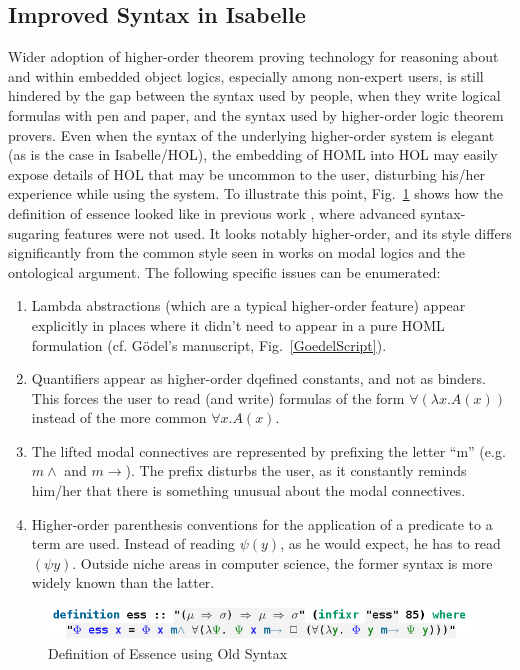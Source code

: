 \documentclass{article}
\newcommand{\imp}{{\rightarrow}}
\begin{document}
\subsection{Improved Syntax in Isabelle}\label{sec:improvedsyntax}

Wider adoption of higher-order theorem proving technology for reasoning about and within embedded object logics, especially among non-expert users, is still hindered by the gap between the syntax used by people, when they write logical formulas with pen and paper, and the syntax used by higher-order logic theorem provers. Even when the syntax of the underlying higher-order system is elegant (as is the case in Isabelle/HOL), the embedding of HOML into HOL may easily expose details of HOL that may be uncommon to the user, disturbing his/her experience while using the system. To illustrate this point, Fig.~\ref{UglyEssence} shows how the definition of essence looked like in previous work \cite{J28}, where advanced syntax-sugaring features were not used. It looks notably higher-order, and its style differs significantly from the common style seen in works on modal logics and the ontological argument. The following specific issues can be enumerated:
\begin{enumerate}
\item Lambda abstractions (which are a typical higher-order feature) appear explicitly in places where it didn't need to appear in a pure HOML formulation (cf. G\"odel's manuscript, Fig.~\ref{GoedelScript}).
\item Quantifiers appear as higher-order dqefined constants, and not as binders. This forces the user to read (and write) formulas of the form $\forall (\lambda x. A(x))$ instead of the more common $\forall x. A(x)$.
\item The lifted modal connectives are represented by prefixing the
  letter ``m'' (e.g. $m\wedge$ and $m\imp$). The prefix disturbs the
  user, as it constantly reminds him/her that there is something
  unusual about the modal connectives.
\item Higher-order parenthesis conventions for the application of a predicate to a term are used. 
Instead of reading $\psi(y)$, as he would expect, he has to read $(\psi y)$. Outside niche areas in computer science, the former syntax is more widely known than the latter.
\end{enumerate}


\begin{figure}
\centerline{\includegraphics[width=\columnwidth]{./Images/UglyEssence.png}}
\caption{ Definition of Essence using Old Syntax } \label{UglyEssence}
\end{figure}
\end{document}

